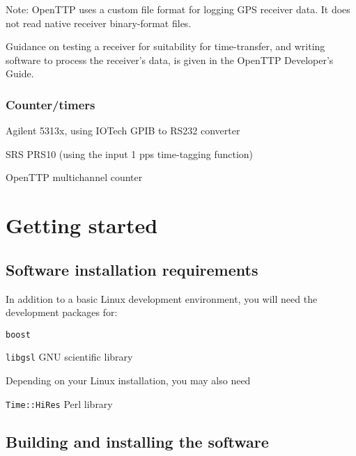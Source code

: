 \documentclass[11pt,a4paper,openany,oneside]{book}
\newcommand{\cc}[1]{{\small\texttt{#1}}}
\newenvironment{description*}%
  {\setlength{\parskip}{0pt}%
	 \begin{description}%
		\setlength{\topsep}{-12pt}%
		\setlength{\itemindent}{-12pt}%
    \setlength{\itemsep}{0pt}%
		\setlength{\itemsep}{0pt}}%
  {\end{description}}
\begin{document}
	Note: OpenTTP uses a custom file format for logging GPS receiver data. It does not read native receiver binary-format files.
	
	Guidance on testing a receiver for suitability for time-transfer, and writing software to process
	the receiver's data, is given in the OpenTTP Developer's Guide.
	
	\subsection{Counter/timers}
	
	\begin{description*}
		\item Agilent 5313x, using IOTech GPIB to RS232 converter
		\item SRS PRS10 (using the input 1 pps time-tagging function)
		\item OpenTTP multichannel counter
	\end{description*}
	
\chapter{Getting started}

\section{Software installation requirements}

In addition to a basic Linux development environment, you will need the development packages for:
\begin{description*}
	\item[\cc{boost}]   
	\item[\cc{libgsl}] GNU scientific library
\end{description*}

Depending on your Linux installation, you may also need
\begin{description*}
	\item[\cc{Time::HiRes}] Perl library
\end{description*}

\section{Building and installing the software}
\end{document}
